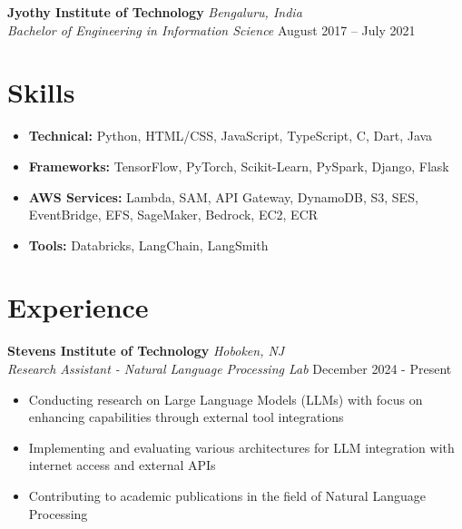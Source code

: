 \documentclass[11pt,a4paper]{article}
\begin{document}
\vspace{-0.5em}
\noindent\textbf{Jyothy Institute of Technology} \hfill \textit{Bengaluru, India}\\
\textit{Bachelor of Engineering in Information Science} \hfill August 2017 – July 2021\\
\vspace{-0.5em}
\section*{Skills}
\begin{itemize}[noitemsep,topsep=2pt]
    \item \textbf{Technical:} Python, HTML/CSS, JavaScript, TypeScript, C, Dart, Java
    \item \textbf{Frameworks:} TensorFlow, PyTorch, Scikit-Learn, PySpark, Django, Flask
    \item \textbf{AWS Services:} Lambda, SAM, API Gateway, DynamoDB, S3, SES, EventBridge, EFS, SageMaker, Bedrock, EC2, ECR
    \item \textbf{Tools:} Databricks, LangChain, LangSmith
\end{itemize}

\section*{Experience}
\noindent\textbf{Stevens Institute of Technology} \hfill \textit{Hoboken, NJ}\\
\textit{Research Assistant - Natural Language Processing Lab} \hfill December 2024 - Present
\begin{itemize}[noitemsep,topsep=2pt]
    \item Conducting research on Large Language Models (LLMs) with focus on enhancing capabilities through external tool integrations
    \item Implementing and evaluating various architectures for LLM integration with internet access and external APIs
    \item Contributing to academic publications in the field of Natural Language Processing
\end{itemize}
\vspace{-0.3em}
\end{document}
